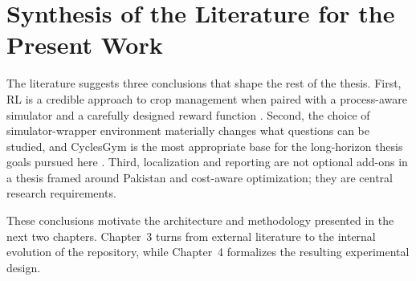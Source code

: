 \section{Synthesis of the Literature for the Present Work}

The literature suggests three conclusions that shape the rest of the thesis. First, RL is a credible approach to crop management when paired with a process-aware simulator and a carefully designed reward function \citep{sutton2018rl,gautron2022review}. Second, the choice of simulator-wrapper environment materially changes what questions can be studied, and CyclesGym is the most appropriate base for the long-horizon thesis goals pursued here \citep{turchetta2022cyclesgym,kallenberg2023cropgym,gautron2022gymdssat}. Third, localization and reporting are not optional add-ons in a thesis framed around Pakistan and cost-aware optimization; they are central research requirements.

These conclusions motivate the architecture and methodology presented in the next two chapters. Chapter~3 turns from external literature to the internal evolution of the repository, while Chapter~4 formalizes the resulting experimental design.
